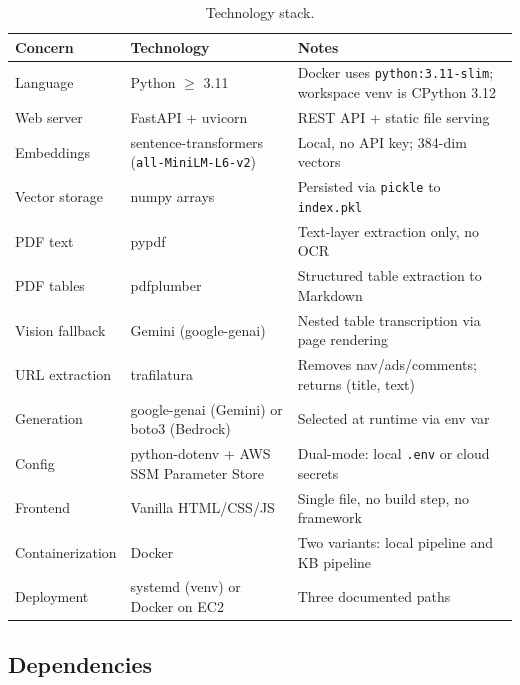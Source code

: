\documentclass[11pt,a4paper]{paper}
\begin{document}
\begin{table}[h]
\centering
\small
\begin{tabular}{>{\raggedright}p{3.2cm} >{\raggedright}p{4.2cm} >{\raggedright\arraybackslash}p{7.0cm}}
\toprule
\textbf{Concern} & \textbf{Technology} & \textbf{Notes} \\
\midrule
Language & Python $\geq$ 3.11 & Docker uses \texttt{python:3.11-slim}; workspace venv is CPython 3.12 \\
Web server & FastAPI + uvicorn & REST API + static file serving \\
Embeddings & sentence-transformers (\texttt{all-MiniLM-L6-v2}) & Local, no API key; 384-dim vectors \\
Vector storage & numpy arrays & Persisted via \texttt{pickle} to \texttt{index.pkl} \\
PDF text & pypdf & Text-layer extraction only, no OCR \\
PDF tables & pdfplumber & Structured table extraction to Markdown \\
Vision fallback & Gemini (google-genai) & Nested table transcription via page rendering \\
URL extraction & trafilatura & Removes nav/ads/comments; returns (title, text) \\
Generation & google-genai (Gemini) or boto3 (Bedrock) & Selected at runtime via env var \\
Config & python-dotenv + AWS SSM Parameter Store & Dual-mode: local \texttt{.env} or cloud secrets \\
Frontend & Vanilla HTML/CSS/JS & Single file, no build step, no framework \\
Containerization & Docker & Two variants: local pipeline and KB pipeline \\
Deployment & systemd (venv) or Docker on EC2 & Three documented paths \\
\bottomrule
\end{tabular}
\caption{Technology stack.}
\label{tab:stack}
\end{table}

\subsection{Dependencies}
\end{document}
